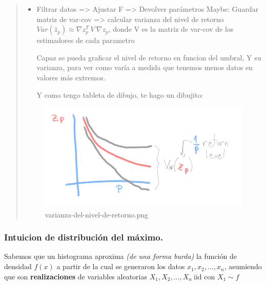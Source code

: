 \documentclass[
]{article}
\begin{document}
\begin{quote}
\begin{itemize}
\item
  Filtrar datos =\textgreater{} Ajustar F =\textgreater{} Devolver
  parámetros Maybe: Guardar matriz de var-cov =\textgreater{} calcular
  varianza del nivel de retorno
  \(Var(\hat z_p)\approx \nabla z_p^T \ V \ \nabla z_p\), donde V es la
  matriz de var-cov de los estimadores de cada parametro

  Capaz se pueda graficar el nivel de retorno en funcion del umbral, Y
  su varianza, para ver como varía a medida que tenemos menos datos en
  valores más extremos.

  Y como tengo tableta de dibujo, te hago un dibujito:
\end{itemize}

\begin{figure}
\centering
\includegraphics{../Imagenes/varianza-del-nivel-de-retorno.png}
\caption{varianza-del-nivel-de-retorno.png}
\end{figure}
\end{quote}

\hypertarget{intuicion-de-distribuciuxf3n-del-muxe1ximo.}{%
\subsubsection{Intuicion de distribución del
máximo.}\label{intuicion-de-distribuciuxf3n-del-muxe1ximo.}}

Sabemos que un histograma aproxima \emph{(de una forma burda)} la
función de densidad \(f(x)\) a partir de la cual se generaron los datos
\(x_1, x_2, \dots, x_n\), asumiendo que son \textbf{realizaciones} de
variables aleatorias \(X_1, X_2, \dots, X_n \ \text{iid}\) con
\(X_1 \sim f\)
\end{document}
